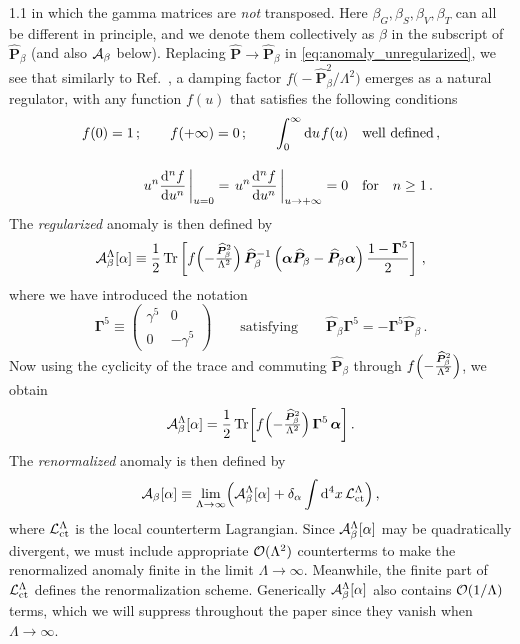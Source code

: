 \documentclass[a4paper,12pt]{article}
\def\L{{\cal L}}
\def\O{{\cal O}}
\def\Acal{{\cal A}}
\def\mat#1{\boldsymbol{#1}}
\def\X{\mat{\widehat{P}}}
\def\G5{\mat{\Gamma}^5}
\def\alphamat{\mat{\alpha}}
\newcommand{\s}{\hspace{0.8pt}}
\begin{document}
\begin{spacing}{1.1}
in which the gamma matrices are \emph{not} transposed. Here $\beta_G, \beta_S, \beta_V, \beta_T$ can all be different in principle, and we denote them collectively as $\beta$ in the subscript of $\X_\beta$ (and also $\Acal_\beta$ below). Replacing $\X \to \X_\beta$ in \cref{eq:anomaly_unregularized}, we see that similarly to Ref.~\cite{Paper1}, a damping factor $f\bigl(-\X_\beta^2/\Lambda^2\bigr)$ emerges as a natural regulator, with any function $f(u)$ that satisfies the following conditions
\begin{subequations}\label{eqn:fconditions}
\begin{align}
f(0) = 1 \,;\qquad
f(+\infty) = 0 \,;\qquad
\int_0^\infty  \dd u\s f(u)
&\quad\text{well defined}\,, \\[10pt]
\left. u^n \frac{\dd^n f}{\dd u^n} \,\right|_{u=0} = \left. u^n \frac{\dd^n f}{\dd u^n}\, \right|_{u\to+\infty} = 0
&\quad\text{for}\quad
n\ge1 \,.
\end{align}
\end{subequations}
The \emph{regularized} anomaly is then defined by
\begin{equation}
\Acal_\beta^\Lambda[\alpha] \equiv \frac12 \Tr \left[ f\Bigl(-\tfrac{\X_\beta^2}{\Lambda^2}\Bigr)\, \X_\beta^{-1} \left( \alphamat \X_\beta - \X_\beta \alphamat \right) \frac{1-\G5}{2} \right] \,,
\end{equation}
where we have introduced the notation
\begin{equation}
\G5 \equiv \left(\begin{smallmatrix} \gamma^5 & 0 \\[2pt] 0 & -\gamma^5 \end{smallmatrix}\right) 
\qquad\text{satisfying}\qquad
\X_\beta \G5 = - \G5 \X_\beta \,.
\end{equation}
Now using the cyclicity of the trace and commuting $\X_\beta$ through $f\Bigl(-\tfrac{\X_\beta^2}{\Lambda^2}\Bigr)$, we obtain
\begin{equation}
\Acal_\beta^\Lambda [\alpha] = \frac12 \Tr \biggl[ f\Bigl( -\tfrac{\X_\beta^2}{\Lambda^2} \Bigr) \, \G5\, \alphamat \biggr] \,.
\label{eq:anomaly_beta}
\end{equation}
The \emph{renormalized} anomaly is then defined by
\begin{equation}
\Acal_\beta[\alpha] \equiv \lim_{\Lambda\to\infty} \Bigl( \Acal_\beta^\Lambda[\alpha] +\delta_\alpha \int \dd^4x \,\L_\text{ct}^\Lambda \Bigr) \,,
\label{eq:A_ren}
\end{equation}
where $\L_\text{ct}^\Lambda$ is the local counterterm Lagrangian. Since $\Acal_\beta^\Lambda[\alpha]$ may be quadratically divergent, we must include appropriate $\O(\Lambda^2)$ counterterms to make the renormalized anomaly finite in the limit $\Lambda\to\infty$. Meanwhile, the finite part of $\L_\text{ct}^\Lambda$ defines the renormalization scheme. Generically $\Acal_\beta^\Lambda[\alpha]$ also contains $\O(1/\Lambda)$ terms, which we will suppress throughout the paper since they vanish when $\Lambda\to\infty$.


\end{spacing}
\end{document}
